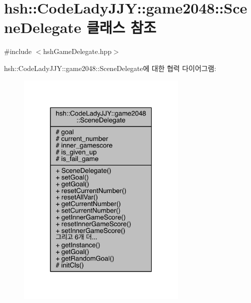 \hypertarget{classhsh_1_1_code_lady_j_j_y_1_1game2048_1_1_scene_delegate}{}\section{hsh\+:\+:Code\+Lady\+J\+JY\+:\+:game2048\+:\+:Scene\+Delegate 클래스 참조}
\label{classhsh_1_1_code_lady_j_j_y_1_1game2048_1_1_scene_delegate}


{\ttfamily \#include $<$hsh\+Game\+Delegate.\+hpp$>$}



hsh\+:\+:Code\+Lady\+J\+JY\+:\+:game2048\+:\+:Scene\+Delegate에 대한 협력 다이어그램\+:
\nopagebreak
\begin{figure}[H]
\begin{center}
\leavevmode
\includegraphics[width=232pt]{db/d2f/classhsh_1_1_code_lady_j_j_y_1_1game2048_1_1_scene_delegate__coll__graph}
\end{center}
\end{figure}
